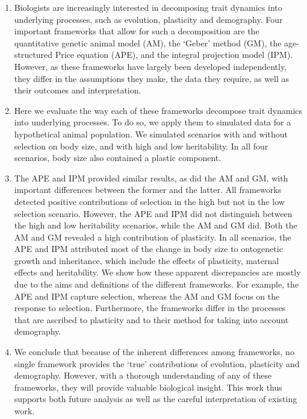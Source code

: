 \noindent \begin{enumerate}
\item Biologists are increasingly interested in decomposing trait dynamics into underlying processes, such as evolution, plasticity and demography. Four important frameworks that allow for such a decomposition are the quantitative genetic animal model (AM), the `Geber' method (GM), the age-structured Price equation (APE), and the integral projection model (IPM). However, as these frameworks have largely been developed independently, they differ in the assumptions they make, the data they require, as well as their outcomes and interpretation. 
\item Here we evaluate the way each of these frameworks decompose trait dynamics into underlying processes. To do so, we apply them to simulated data for a hypothetical animal population. We simulated scenarios with and without selection on body size, and with high and low heritability. In all four scenarios, body size also contained a plastic component.
\item The APE and IPM provided similar results, as did the AM and GM, with important differences between the former and the latter. All frameworks detected positive contributions of selection in the high but not in the low selection scenario. However, the APE and IPM did not distinguish between the high and low heritability scenarios, while the AM and GM did. Both the AM and GM revealed a high contribution of plasticity. In all scenarios, the APE and IPM attributed most of the change in body size to ontogenetic growth and inheritance, which include the effects of plasticity, maternal effects and heritability. We show how these apparent discrepancies are mostly due to the aims and definitions of the different frameworks. For example, the APE and IPM capture selection, whereas the AM and GM focus on the response to selection. Furthermore, the frameworks differ in the processes that are ascribed to plasticity and to their method for taking into account demography.
\item We conclude that because of the inherent differences among frameworks, no single framework provides the `true' contributions of evolution, plasticity and demography. However, with a thorough understanding of any of these frameworks, they will provide valuable biological insight. This work thus supports both future analysis as well as the careful interpretation of existing work.

\end{enumerate}

